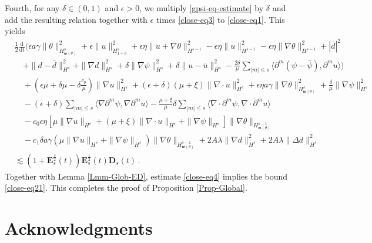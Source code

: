 \documentclass[reqno,11pt]{amsart}
\numberwithin{equation}{section}
\def\d{\mathrm{d}}
\def\no{\nonumber}
\def\w{\mathfrak{w}}
\begin{document}
Fourth, for any $\delta \in (0,1)$ and $\epsilon > 0$, we multiply \eqref{gpsi-eq-estimate} by $\delta$ and add the resulting relation together with $\epsilon$ times \eqref{close-eq3} to \eqref{close-eq1}. This yields
\begin{align}\label{close-eq4}
\no & \frac{1}{2} \frac{\d}{\d t} ( \epsilon a \gamma \|\theta\|_{H_{ \w (\theta) }^s}^2 + \epsilon \|u\|_{H_{1+\theta}^s}^2 + \epsilon \eta \|u + \nabla \theta\|_{H^{s-1}}^2 - \epsilon \eta \|u\|_{H^{s-1}}^2 - \epsilon \eta \|\nabla \theta\|_{H^{s-1}}^2 + |\bar{d}|^2 \\
\no & \quad + \|d - \bar{d}\|_{H^s}^2 + \|\nabla d\|_{H^s}^2 + \delta \|\nabla \psi\|_{H^s}^2 + \delta \|u - \bar{u}\|_{H^s}^2 - \frac{2\delta}{\mu} \sum_{|m| \leq s} \langle \partial^m (\psi - \bar{\psi}), \partial^m u \rangle ) \\
\no & \quad+ (\epsilon \mu + \delta \mu  - \delta \frac{c_p}{\mu} ) \|\nabla u\|_{H^s}^2 + (\epsilon + \delta) (\mu + \xi ) \|\nabla \cdot u\|_{H^s}^2 + \epsilon \eta a \gamma \|\nabla \theta\|_{H_{ \w (\theta) }^s }^2 + \frac{\delta}{\mu} \| \nabla \psi\|_{H^s}^2 \\
\no & \quad- (\epsilon + \delta) \sum_{|m| \leq s} \langle \nabla \partial^m \psi, \nabla \partial^m u \rangle - \frac{\mu + \xi}{\mu} \delta \sum_{|m| \leq s} \langle \nabla \cdot \partial^m \psi, \nabla \cdot \partial^m u \rangle \\
& \quad - c_0 \epsilon \eta [ \mu \| \nabla u \|_{H^s} + (\mu + \xi) \| \nabla \cdot u \|_{H^s} + \| \nabla \psi \|_{H^s} ] \| \nabla \theta \|_{ H^{s-1}_{ \w (\theta) } } \\
\no & \quad - c_1 \delta a \gamma ( \mu \| \nabla u \|_{H^s} + \| \nabla \psi \|_{H^s} ) \| \nabla \theta \|_{ H^{s-1}_{ \w (\theta) } }  + 2A\lambda \|\nabla d\|_{H^s}^2 + 2A\lambda \|\Delta d\|_{H^s}^2 \\
\no & \lesssim ( 1 + \mathbf{E}_s^\frac{s}{2} (t) ) \mathbf{E}_s^\frac{1}{2} (t) \mathbf{D}_s (t) \,.
\end{align}
Together with Lemma \ref{Lmm-Glob-ED}, estimate \eqref{close-eq4} implies the bound \eqref{close-eq21}. This completes the proof of Proposition \ref{Prop-Global}.


\section*{Acknowledgments}
\end{document}
